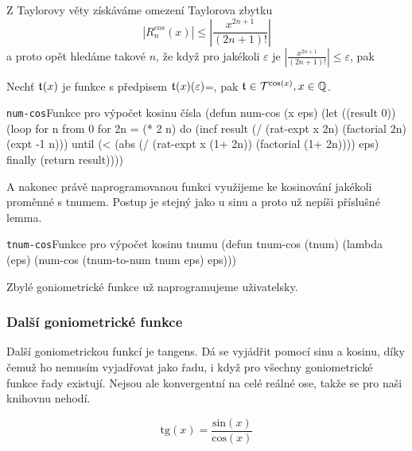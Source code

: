 Z Taylorovy věty získáváme omezení Taylorova zbytku
\begin{equation}
|R^{cos}_n(x)|\leq\left|\frac{x^{2n+1}}{(2n+1)!}\right|
\end{equation}
a proto opět hledáme takové $n$, že když pro jakékoli $\varepsilon$ je $|\frac{x^{2n+1}}{(2n+1)!}|\leq\varepsilon$, pak 
\begin{consequence} Nechť $\mathfrak{t}^{}(x)$ je funkce s předpisem $\mathfrak{t}^{}(x)(\varepsilon)$=, pak $\mathfrak{t}^{}\in\mathcal{T}^{\mathrm{cos}(x)},x\in\mathbb{Q}$.
\end{consequence}\clearpage\begin{lispcode}{\texttt{num-cos}}{Funkce pro výpočet kosinu čísla}
(\textcolor{funkcionalni}{defun} \textcolor{pojmenovan}{num-cos} (x eps)
  (\textcolor{vedlejsi}{let} ((result 0))
    (\textcolor{funkcionalni}{loop} \textcolor{obarvi}{for} n \textcolor{obarvi}{from} 0
          \textcolor{obarvi}{for} 2n = (\textcolor{matematicke}{*} 2 n)
          \textcolor{obarvi}{do} (\textcolor{vedlejsi}{incf} result
                   (\textcolor{matematicke}{/} (\textcolor{moje}{rat-expt} x 2n)
                      (\textcolor{moje}{factorial} 2n)
                      (\textcolor{matematicke}{expt} -1 n)))
          \textcolor{obarvi}{until} (\textcolor{matematicke}{<} (\textcolor{matematicke}{abs} (\textcolor{matematicke}{/} (\textcolor{moje}{rat-expt} x (\textcolor{matematicke}{1+} 2n))
                           (\textcolor{moje}{factorial} (\textcolor{matematicke}{1+} 2n))))
                   eps)
          \textcolor{obarvi}{finally} (\textcolor{funkcionalni}{return} result))))
\end{lispcode}

A nakonec právě naprogramovanou funkci využijeme ke kosinování jakékoli proměnné s tnumem. Postup je stejný jako u sinu a proto už nepíši příslušné lemma.

\begin{lispcode}{\texttt{tnum-cos}}{Funkce pro výpočet kosinu tnumu}
(\textcolor{funkcionalni}{defun} \textcolor{pojmenovan}{tnum-cos} (tnum)
  (\textcolor{funkcionalni}{lambda} (eps)
    (\textcolor{moje}{num-cos} (\textcolor{moje}{tnum-to-num} tnum eps) eps)))
\end{lispcode}

Zbylé goniometrické funkce už naprogramujeme uživatelsky.

\subsubsection{Další goniometrické funkce}
Další goniometrickou funkcí je tangens. Dá se vyjádřit pomocí sinu a kosinu, díky čemuž ho nemusím vyjadřovat jako řadu, i když pro všechny goniometrické funkce řady existují. Nejsou ale konvergentní na celé reálné ose, takže se pro naši knihovnu nehodí.
\begin{fact}
\begin{equation}
\mathrm{tg}(x)=\frac{\mathrm{sin}(x)}{\mathrm{cos}(x)}
\end{equation}
\end{fact}

